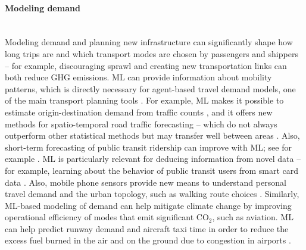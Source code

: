 \documentclass[11pt]{report}
\newcommand{\Gap}{\texorpdfstring{\hfill}{}}
\newcommand{\Rec}{\texorpdfstring{{\small\emph{\color{blue}{\fbox{High Leverage}}}}}{}}
\begin{document}
\paragraph*{Modeling demand}\Gap\textbf{\Rec}\mbox{}\\Modeling demand and planning new infrastructure can significantly shape how long trips are and which transport modes are chosen by passengers and shippers -- for example, discouraging sprawl and creating new transportation links can both reduce GHG emissions. 
ML can provide information about mobility patterns, which is directly necessary for agent-based travel demand models, one of the main transport planning tools \cite{feygin7932990}.
For example, ML makes it possible to estimate origin-destination demand from traffic counts \cite{MA201896}, and it offers new methods for spatio-temporal road traffic forecasting -- which do not always outperform other statistical methods \cite{doi:10.1080/01441647.2018.1442887} 
but may transfer well between areas \cite{Tang2018spatial}.
Also, short-term forecasting of public transit ridership can improve with ML; see for example \cite{Dai:2018aa, NOURSALEHI2018277}. 
ML is particularly relevant for deducing information from novel data -- for example, learning about the behavior of public transit users from smart card data \cite{Manley2018, Ghaemi_2017}.
Also, mobile phone sensors provide new means to understand personal travel demand and the urban topology, such as walking route choices \cite{doi:10.1177/0265813516659286}. 
Similarly, ML-based modeling of demand can help mitigate climate change by improving operational efficiency of modes that emit significant CO$_2$, such as aviation. ML can help predict runway demand and aircraft taxi time in order to reduce the excess fuel burned in the air and on the ground due to congestion in airports \cite{JACQUILLAT2018168, lee2015taxi}.
\end{document}
